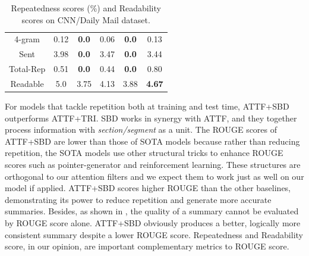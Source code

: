 \begin{table}[th!]
\begin{center}
{\begin{tabular}{|c|c|cccc|}
                4-gram & 0.12 & \bf 0.0 & 0.06 & \bf 0.0 & 0.13 \\
                Sent & 3.98 & \bf 0.0 & 3.47 & \bf 0.0 & 3.44 \\
                \hline
                Total-Rep & 0.51 & \bf 0.0 & 0.44 & \bf 0.0 & 0.80 \\
                \hline
                Readable & 5.0 & 3.75 & 4.13 & 3.88 & \bf 4.67 \\
                \hline
            \end{tabular}
        }
\DIFaddendFL \caption{Repeatedness scores (\%) and Readability scores on CNN/Daily Mail dataset.
\DIFaddbeginFL {}\DIFaddendFL }
\label{tab:eval_repe}
\end{center}
\end{table}


For models that tackle repetition both at training and test time, 
ATTF+SBD outperforms ATTF+TRI.
SBD works in synergy with ATTF, and they together process 
information with \textit{section/segment} as a unit.
The ROUGE scores of ATTF+SBD are lower than
those of SOTA models 
because rather than reducing repetition, the SOTA models use 
other structural tricks to enhance ROUGE scores 
such as pointer-generator and reinforcement learning.
These structures are orthogonal 
to our attention filters
and we expect them to work just as well on our model if applied.
ATTF+SBD scores higher ROUGE than the other baselines, 
demonstrating its power to  reduce 
repetition and generate more accurate summaries.
Besides, as shown in , the quality of a summary cannot be evaluated by
ROUGE score alone.
ATTF+SBD obviously produces a better, logically more consistent summary despite 
a lower ROUGE score.  
\DIFaddbegin {}\DIFaddend Repeatedness and Readability score, 
in our opinion, are important complementary metrics to ROUGE score.  

